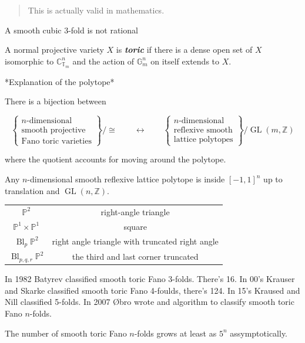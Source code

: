 \begin{quotation}
This is actually valid in mathematics.
\end{quotation}

\begin{theorem}
\label{theorem-moraga-3}
A smooth cubic 3-fold is not rational
\end{theorem}

\begin{definition}
\label{definition-moraga-4}
A normal projective variety $X$ is
\textit{\textbf{toric}} if there is a dense
open set of $X$ isomorphic to
$\mathbb{C}^{n}_{\mathbb{T}_{m}}$ and the
action of $\mathbb{G}^{n}_{m}$ on itself
extends to $X$.
\end{definition}

{*Explanation of the polytope*}

\begin{theorem}[Cox]
\label{theorem-moraga-4}
There is a bijection between

$$
\left\{ \substack{n\text{-dimensional}
\\\text{smooth projective} \\\text{Fano toric
varieties}  } \right\}/\cong   \qquad
\longleftrightarrow\qquad  \left\{
\substack{n\text{-dimensional}  \\
\text{reflexive smooth} \\\text{lattice
polytopes} }
\right\}/\operatorname{GL}(m,\mathbb{Z})
$$

where the quotient accounts for moving around
the polytope.
\end{theorem}

\medskip{} Any $n$-dimensional smooth
reflexive lattice polytope is inside
$[-1,1]^{n}$ up to translation and
$\operatorname{GL}(n,\mathbb{Z})$.

\begin{tabular}{cc}
$\mathbb{P}^{2}$ &right-angle triangle\\
$\mathbb{P}^{1} \times
\mathbb{P}^{1}$&square\\
$\operatorname{Bl}_{p}\mathbb{P}^{2}$ &right
angle triangle with truncated right angle\\
$\operatorname{Bl}_{p,q,r}\mathbb{P}^{2}$&
the third and last corner truncated

\end{tabular}
\begin{remark}
\label{remark-moraga-1}
In 1982 Batyrev classified smooth toric Fano
3-folds. There's 16. In 00's Krauser and
Skarke classified smooth toric Fano 4-foulds,
there's 124. In 15's Kraused and Nill
classified 5-folds. In 2007 \O bro wrote and
algorithm to classify smooth toric Fano
$n$-folds.

The number of smooth toric Fano $n$-folds
grows at least as $5^{n}$ assymptotically.
\end{remark}

